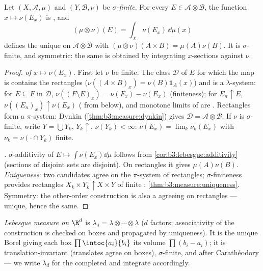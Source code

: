 \begin{theorem}\label{thm:b3:product:existence}
Let $(X, \mathcal A, \mu)$ and $(Y, \mathcal B, \nu)$ be
\emph{$\sigma$-finite}. For every $E \in \mathcal
A\otimes\mathcal B$, the function $x \mapsto \nu(E_x)$ is
, and
\[
(\mu\otimes\nu)(E) = \int_X \nu(E_x)\,\dd\mu(x)
\]
defines the unique  on $\mathcal A\otimes\mathcal B$
with $(\mu\otimes\nu)(A\times B) = \mu(A)\nu(B)$. It is
$\sigma$-finite, and symmetric: the same  is obtained by
integrating $x$-sections against $\nu$.
\end{theorem}

\begin{proof}
\emph{ of $x \mapsto \nu(E_x)$.} First let $\nu$
be finite. The class $\mathcal D$ of $E$ for which the map is
 contains the rectangles ($\nu((A\times B)_x) =
\nu(B)\mathbf 1_A(x)$) and is a $\lambda$-system: for $E
\subseteq F$ in $\mathcal D$, $\nu((F\setminus E)_x) =
\nu(F_x) - \nu(E_x)$ (finiteness); for $E_n \uparrow E$,
$\nu((E_n)_x) \uparrow \nu(E_x)$ ( from below), and
monotone limits of  are .
Rectangles form a $\pi$-system: Dynkin
(\cref{thm:b3:measure:dynkin}) gives $\mathcal D = \mathcal
A\otimes\mathcal B$. If $\nu$ is $\sigma$-finite, write $Y =
\bigcup Y_k$, $Y_k \uparrow$, $\nu(Y_k) < \infty$: $\nu(E_x) =
\lim_k\nu_k(E_x)$ with $\nu_k = \nu(\cdot\cap Y_k)$ finite.

\emph{.} $\sigma$-additivity of $E \mapsto
\int\nu(E_x)\dd\mu$ follows from
\cref{cor:b3:lebesgue:additivity} (sections of disjoint sets
are disjoint). On rectangles it gives $\mu(A)\nu(B)$.
\emph{Uniqueness}: two candidates agree on the $\pi$-system of
rectangles; $\sigma$-finiteness provides rectangles $X_k\times
Y_k \uparrow X\times Y$ of finite :
\cref{thm:b3:measure:uniqueness}. Symmetry: the
other-order construction is also a  agreeing on
rectangles --- unique, hence the same.
\end{proof}

\begin{definition}\label{def:b3:product:lebesgue}
\emph{Lebesgue measure on $\R^d$} is $\lambda_d = \lambda\otimes\cdots\otimes\lambda$
($d$ factors; associativity of the construction is checked on
boxes and propagated by uniqueness). It is the unique Borel
 giving each box $\prod\intoc{a_i}{b_i}$ its volume
$\prod(b_i - a_i)$; it is translation-invariant (translates
agree on boxes), $\sigma$-finite, and  after
Carath\'eodory  --- we write $\lambda_d$ for the
completed  and integrate accordingly.
\end{definition}

